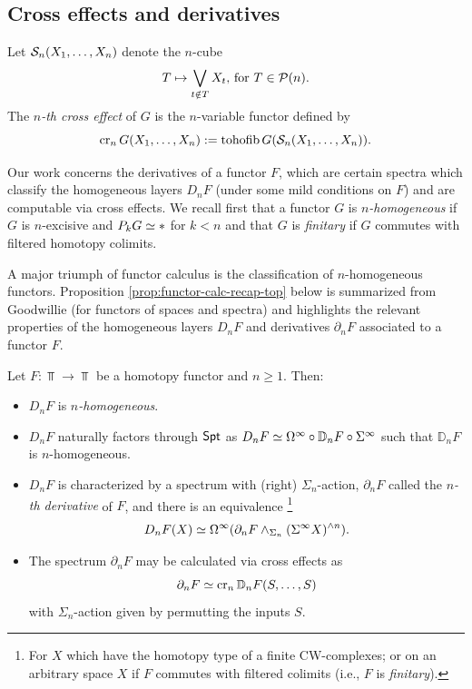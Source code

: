 \subsection{Cross effects and derivatives}
Let $\mathcal{S}_n(X_1,\dots,X_n)$ denote the $n$-cube \[\text{$T\mapsto \bigvee_{t\notin T} X_t$, for $T\in \mathcal{P}(n)$.}\] The \textit{$n$-th cross effect} of $G$ is the $n$-variable functor defined by \[\operatorname{cr}_n G(X_1,\dots,X_n):= \operatorname{tohofib} G( \mathcal{S}_n(X_1,\dots, X_n)).\]

Our work concerns the derivatives of a functor $F$, which are certain spectra which classify the homogeneous layers $D_nF$ (under some mild conditions on $F$) and are computable via cross effects. We recall first that a functor $G$ is \textit{$n$-homogeneous} if $G$ is $n$-excisive and $P_k G\simeq *$ for $k<n$ and that $G$ is \textit{finitary} if $G$ commutes with filtered homotopy colimits. 

A major triumph of functor calculus is the classification of $n$-homogeneous functors. Proposition \ref{prop:functor-calc-recap-top} below is summarized from Goodwillie \cite{Goo-Calc3} (for functors of spaces and spectra) and highlights the relevant properties of the homogeneous layers $D_nF$ and derivatives $\partial_n F$ associated to a functor $F$.

\begin{proposition}
\label{prop:functor-calc-recap-top}
Let $F\colon \Top\to \Top$ be a homotopy functor and $n\geq 1$. Then: \begin{itemize}
\item $D_nF$ is \textit{$n$-homogeneous}.

\item $D_nF$ naturally factors through $\mathsf{Spt}$ as $ D_nF\simeq \Omega^{\infty} \circ \mathbb{D}_nF \circ \Sigma^{\infty}$ such that $\mathbb{D}_n F$ is $n$-homogeneous.

\item $D_nF$ is characterized by a spectrum with (right) $\Sigma_n$-action, $\partial_n F$ called the \textit{$n$-th derivative} of $F$, and there is an equivalence \footnote{For $X$ which have the homotopy type of a finite CW-complexes; or on an arbitrary space $X$ if $F$ commutes with filtered colimits (i.e., $F$ is \textit{finitary}). } \[
    D_n F(X) \simeq \Omega^{\infty} (\partial_nF \wedge_{\Sigma_n} (\Sigma^{\infty} X)^{\wedge n}).\]
    
\item The spectrum $\partial_nF$ may be calculated via cross effects \cite[]{Goo-Calc3} as \[\partial_n F \simeq \operatorname{cr}_n \mathbb{D}_n F (S,\dots,S)\] with $\Sigma_n$-action given by permutting the inputs $S$.
\end{itemize}
\end{proposition} 

